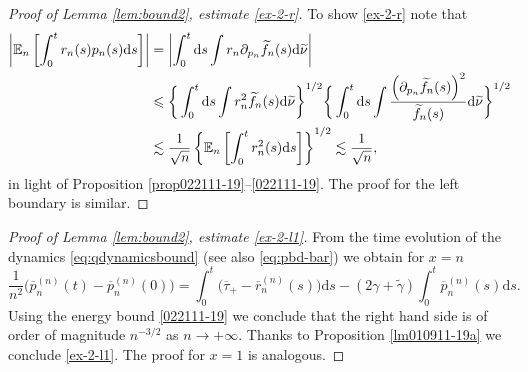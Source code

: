 \documentclass[EJP]{ejpecp} %
\renewcommand{\le}{\leqslant}
\newcommand{\dd  }{\mathrm{d}}
\renewcommand{\tilde}{\widetilde}
\renewcommand{\bar}{\overline}
\numberwithin{equation}{section}
\begin{document}
\begin{proof}[Proof of Lemma \ref{lem:bound2}, estimate  \eqref{ex-2-r}]
To show \eqref{ex-2-r} note that
  \begin{align}
\label{013112-19}
    \left|\mathbb{E}_n\left[ \int_0^t r_n(s) p_n(s) \dd s \right]\right|
      & = \left|\int_0^t \dd s \int r_n \partial_{p_n}\tilde  f_n(s)
        \dd\tilde\nu\right| \\
 & \le  \bigg\{\int_0^t \dd s \int r_n^2\tilde  f_n(s) \dd\tilde\nu\bigg\}^{1/2}  \bigg\{ \int_0^t  \dd s \int \frac{\left( \partial_{p_n} \tilde f_n(s) \right)^2}{\tilde f_n(s)} \dd\tilde\nu \bigg\}^{1/2}\notag\\
     & \lesssim  
     \frac{1}{ \sqrt{n}} \left\{\mathbb{E}_n\left[ \int_0^t r_n^2(s)
       \dd s\right] \right\}^{1/2} \lesssim \frac{1}{\sqrt{n}}, \notag
  \end{align}
in light of Proposition \ref{prop022111-19}--\eqref{022111-19}.
  The proof for the left boundary is similar.
\end{proof}



\begin{proof}[Proof of Lemma \ref{lem:bound2}, estimate \eqref{ex-2-l1}]
From the time evolution of the dynamics \eqref{eq:qdynamicsbound} (see also \eqref{eq:pbd-bar}) we obtain for $x=n$
 \begin{equation}
\frac{1}{n^2} \Big(\bar    p_n^{(n)}(t)- \bar    p_n^{(n)}(0)\Big)=  \int_0^t\big(\bar\tau_+  -  \bar r_n^{(n)}(s)\big)\dd s -(2\gamma +  \tilde \gamma) \int_0^t\bar    p_n^{(n)}(s) \dd s \label{eq:pbd-bar2a}.
   \end{equation}
Using the energy bound \eqref{022111-19} we conclude that the right hand side is of
order of magnitude $n^{-3/2}$
as $n\to+\infty$. Thanks to Proposition \ref{lm010911-19a} we conclude
\eqref{ex-2-l1}. The proof for $x=1$ is analogous.
\end{proof}
\end{document}
